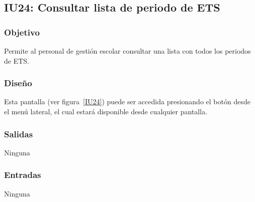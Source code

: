 
\subsection{IU24: Consultar lista de periodo de ETS}
\subsubsection{Objetivo}
   Permite al personal de gestión escolar consultar una lista con todos los periodos de ETS.
\subsubsection{Diseño}
    Esta pantalla  (ver figura~\ref{IU24}) puede ser accedida presionando el botón  desde el menú lateral, el cual estará disponible desde cualquier pantalla. 

\subsubsection{Salidas}
Ninguna
\subsubsection{Entradas}
Ninguna
